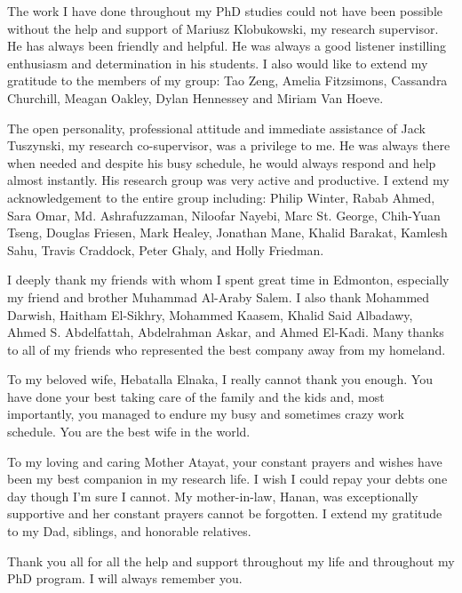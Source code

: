 \documentclass[11pt]{report}
\begin{document}
\begin{acknowledgements}
The work I have done throughout my PhD studies could not have been possible 
without the help and support of Mariusz Klobukowski, my research supervisor.
He has always been friendly and helpful. He was always a good listener instilling enthusiasm and determination in his students. I also would like to 
extend my gratitude to the members of my group: Tao Zeng, Amelia 
Fitzsimons, Cassandra Churchill, Meagan Oakley, Dylan Hennessey and Miriam Van Hoeve. 

The open personality, professional attitude and immediate assistance
of Jack Tuszynski, my research co-supervisor, was a privilege to me.
He was always there when needed and despite his busy schedule, he would always
respond and help almost instantly. His research group was very active and
productive. I extend my acknowledgement to the entire group including:
Philip Winter, Rabab Ahmed, Sara Omar, Md. Ashrafuzzaman, Niloofar Nayebi, Marc St. George, Chih-Yuan Tseng,
Douglas Friesen, Mark Healey, Jonathan Mane, Khalid Barakat, Kamlesh Sahu, Travis Craddock, Peter Ghaly,
and Holly Friedman.

I deeply thank my friends with whom I spent great time in Edmonton, especially
my friend and brother Muhammad Al-Araby Salem. I also thank Mohammed Darwish,
Haitham El-Sikhry, Mohammed Kaasem, Khalid Said Albadawy, Ahmed S. Abdelfattah,
Abdelrahman Askar, and Ahmed El-Kadi. Many thanks to all of my friends who
represented the best company away from my homeland.

To my beloved wife, Hebatalla Elnaka, I really cannot thank you enough. You
have done your best taking care of the family and the kids and, most importantly,
you managed to endure my busy and sometimes crazy work schedule. 
You are the best wife in the world.

To my loving and caring Mother Atayat, your constant prayers and wishes
have been my best companion in my research life. I wish I could repay 
your debts one day though I'm sure I cannot. My mother-in-law, Hanan,
was exceptionally supportive and her constant prayers cannot be forgotten.
I extend my gratitude to my Dad, siblings, and honorable relatives.

Thank you all for all the help and support throughout my life and throughout my
PhD program. I will always remember you.
 
\end{acknowledgements}
%
%
%
%
%
%
%
%
%
%
%
%
%
%
%
%
%
%
%
%
%
%
%
%
%
%
%
%
%
%
%
%
%
%
%
%
%
%
%
%
\end{document}
